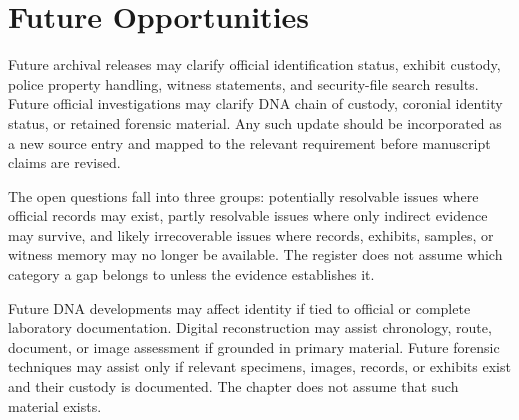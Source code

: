 \section{Future Opportunities}

Future archival releases may clarify official identification status, exhibit custody, police property handling, witness statements, and security-file search results. Future official investigations may clarify DNA chain of custody, coronial identity status, or retained forensic material. Any such update should be incorporated as a new source entry and mapped to the relevant requirement before manuscript claims are revised.

The open questions fall into three groups: potentially resolvable issues where official records may exist, partly resolvable issues where only indirect evidence may survive, and likely irrecoverable issues where records, exhibits, samples, or witness memory may no longer be available. The register does not assume which category a gap belongs to unless the evidence establishes it.

Future DNA developments may affect identity if tied to official or complete laboratory documentation. Digital reconstruction may assist chronology, route, document, or image assessment if grounded in primary material. Future forensic techniques may assist only if relevant specimens, images, records, or exhibits exist and their custody is documented. The chapter does not assume that such material exists.

